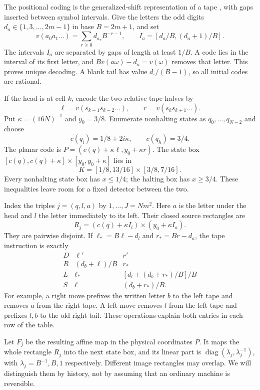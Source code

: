 \documentclass[11pt]{article}
\begin{document}
The positional coding is the generalized-shift representation of a tape
\cite[Section~1, Lemma~0]{Moore}, with gaps inserted between symbol intervals.
Give the letters the odd digits $d_a\in\{1,3,\ldots,2m-1\}$ in base
$B=2m+1$, and set
\[
 v(a_0a_1\ldots)=\sum_{r\geq0}d_{a_r}B^{-r-1},
 \qquad I_a=[d_a/B,(d_a+1)/B].
\]
The intervals $I_a$ are separated by gaps of length at least $1/B$.
A code lies in the interval of its first letter, and
$Bv(a\omega)-d_a=v(\omega)$ removes that letter. This proves unique
decoding. A blank tail has value $d_{\square}/(B-1)$, so all initial
codes are rational.

If the head is at cell $k$, encode the two relative tape halves by
\[
 \ell=v(s_{k-1}s_{k-2}\ldots),\qquad r=v(s_ks_{k+1}\ldots).
\]
Put $\kappa=(16N)^{-1}$ and $y_0=3/8$. Enumerate nonhalting states as
$q_0,\ldots,q_{N-2}$ and choose
\[
 c(q_i)=1/8+2i\kappa,\qquad c(q_h)=3/4.
\]
The planar code is $P=(c(q)+\kappa\ell,y_0+\kappa r)$. The state box
$[c(q),c(q)+\kappa]\times[y_0,y_0+\kappa]$ lies in
\[
 K=[1/8,13/16]\times[3/8,7/16].
\]
Every nonhalting state box has $x\leq1/4$; the halting box has $x\geq3/4$.
These inequalities leave room for a fixed detector between the two.

Index the triples $j=(q,l,a)$ by $1,\ldots,J=Nm^2$. Here $a$ is the
letter under the head and $l$ the letter immediately to its left. Their
closed source rectangles are
\[
 R_j=(c(q)+\kappa I_l)\times(y_0+\kappa I_a).
\]
They are pairwise disjoint. If $\ell_*=B\ell-d_l$ and $r_*=Br-d_a$,
the tape instruction is exactly
\begin{equation}\label{eq:branches}
\begin{array}{c|cc}
D&\ell'&r'\\ \hline
R&(d_b+\ell)/B&r_*\\
L&\ell_*&[d_l+(d_b+r_*)/B]/B\\
S&\ell&(d_b+r_*)/B.
\end{array}
\end{equation}
For example, a right move prefixes the written letter $b$ to the left
tape and removes $a$ from the right tape. A left move removes $l$ from
the left tape and prefixes $l,b$ to the old right tail. These operations
explain both entries in each row of the table.

Let $F_j$ be the resulting affine map in the physical coordinates $P$.
It maps the whole rectangle $R_j$ into the next state box, and its linear
part is $\operatorname{diag}(\lambda_j,\lambda_j^{-1})$, with
$\lambda_j=B^{-1},B,1$ respectively. Different image rectangles may
overlap. We will distinguish them by history, not by assuming that an
ordinary machine is reversible.
\end{document}
